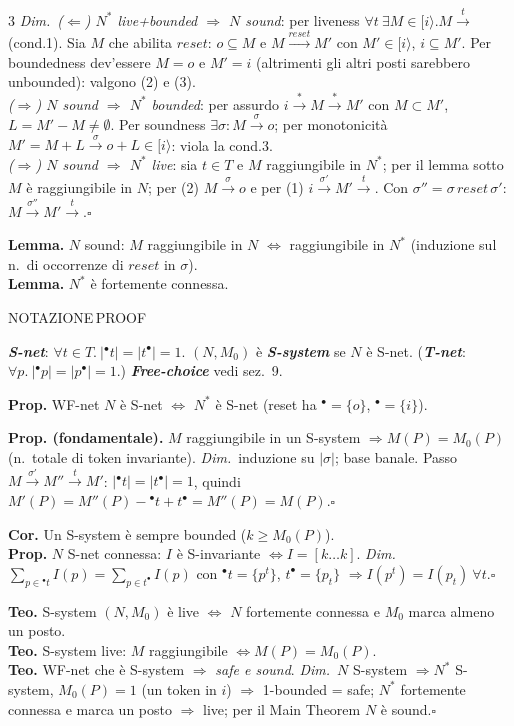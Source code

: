 \documentclass[8pt,a4paper]{extarticle}
\newcommand{\NOT}{\colorbox{black!12}{\tiny\textsf{NOTAZIONE}}}
\newcommand{\PRF}{\colorbox{pf!20}{\tiny\textsf{PROOF}}}
\newcommand{\topic}[2]{%
  \Needspace*{5\baselineskip}%
  \vspace{3pt}\noindent{\color{tit}\bfseries\footnotesize #1}\hfill #2\par
  \vspace{-1pt}{\color{tit}\rule{\linewidth}{0.6pt}}\par\vspace{1pt}}
\newcommand{\D}[1]{\textbf{\textit{#1}}}
\newcommand{\pre}[1]{{}^{\bullet}#1}
\newcommand{\post}[1]{#1^{\bullet}}
\newcommand{\pf}{{\color{pf}\textit{Dim.}}~}
\newcommand{\sq}{\hfill\ensuremath{\square}}
\begin{document}
\begin{multicols}{3}
\pf \emph{($\Leftarrow$) $N^*$ live+bounded $\Rightarrow$ $N$ sound}: per liveness $\forall t\ \exists M\in[i\rangle.M\xrightarrow{t}$ (cond.1). Sia $M$ che abilita $reset$: $o\subseteq M$ e $M\xrightarrow{reset}M'$ con $M'\in[i\rangle$, $i\subseteq M'$. Per boundedness dev'essere $M=o$ e $M'=i$ (altrimenti gli altri posti sarebbero unbounded): valgono (2) e (3).\\
\emph{($\Rightarrow$) $N$ sound $\Rightarrow$ $N^*$ bounded}: per assurdo $i\xrightarrow{*}M\xrightarrow{*}M'$ con $M\subset M'$, $L=M'-M\neq\emptyset$. Per soundness $\exists\sigma: M\xrightarrow{\sigma}o$; per monotonicità $M'=M+L\xrightarrow{\sigma}o+L\in[i\rangle$: viola la cond.3.\\
\emph{($\Rightarrow$) $N$ sound $\Rightarrow$ $N^*$ live}: sia $t\in T$ e $M$ raggiungibile in $N^*$; per il lemma sotto $M$ è raggiungibile in $N$; per (2) $M\xrightarrow{\sigma}o$ e per (1) $i\xrightarrow{\sigma'}M'\xrightarrow{t}$. Con $\sigma''=\sigma\,reset\,\sigma'$: $M\xrightarrow{\sigma''}M'\xrightarrow{t}$.\sq

\textbf{Lemma.} $N$ sound: $M$ raggiungibile in $N$ $\iff$ raggiungibile in $N^*$ (induzione sul n.\ di occorrenze di $reset$ in $\sigma$).\\
\textbf{Lemma.} $N^*$ è fortemente connessa.

\topic{8. S-net, S-System e proprietà}{\NOT\,\PRF}
\D{S-net}: $\forall t\in T.\ |\pre{t}|=|\post{t}|=1$. $(N,M_0)$ è \D{S-system} se $N$ è S-net.
(\D{T-net}: $\forall p.\ |\pre{p}|=|\post{p}|=1$.)
\D{Free-choice} vedi sez.~9.

\textbf{Prop.} WF-net $N$ è S-net $\iff$ $N^*$ è S-net (reset ha $\pre{}=\{o\}$, $\post{}=\{i\}$).

\textbf{Prop. (fondamentale).} $M$ raggiungibile in un S-system $\Rightarrow M(P)=M_0(P)$ (n.\ totale di token invariante).
\pf induzione su $|\sigma|$; base banale. Passo $M\xrightarrow{\sigma'}M''\xrightarrow{t}M'$: $|\pre{t}|=|\post{t}|=1$, quindi $M'(P)=M''(P)-\pre{t}+\post{t}=M''(P)=M(P)$.\sq

\textbf{Cor.} Un S-system è sempre bounded ($k\ge M_0(P)$).\\
\textbf{Prop.} $N$ S-net connessa: $I$ è S-invariante $\iff I=[k\dots k]$.
\pf $\sum_{p\in\pre{t}}I(p)=\sum_{p\in\post{t}}I(p)$ con $\pre{t}=\{p^t\}$, $\post{t}=\{p_t\}$ $\Rightarrow I(p^t)=I(p_t)\ \forall t$.\sq

\textbf{Teo.} S-system $(N,M_0)$ è live $\iff$ $N$ fortemente connessa e $M_0$ marca almeno un posto.\\
\textbf{Teo.} S-system live: $M$ raggiungibile $\iff M(P)=M_0(P)$.\\
\textbf{Teo.} WF-net che è S-system $\Rightarrow$ \emph{safe e sound}.
\pf $N$ S-system $\Rightarrow N^*$ S-system, $M_0(P)=1$ (un token in $i$) $\Rightarrow$ 1-bounded = safe; $N^*$ fortemente connessa e marca un posto $\Rightarrow$ live; per il Main Theorem $N$ è sound.\sq


\end{multicols}
\end{document}
